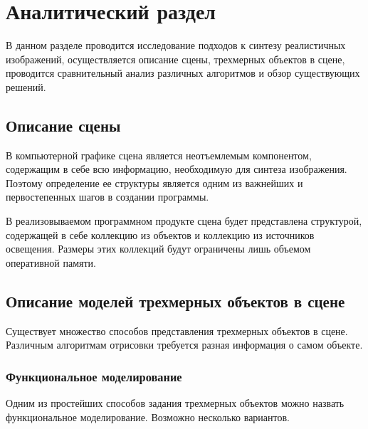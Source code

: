 \chapter{Аналитический раздел}

В данном разделе проводится исследование подходов к синтезу реалистичных изображений, осуществляется описание сцены, трехмерных объектов в сцене, проводится сравнительный анализ различных алгоритмов и обзор существующих решений.

\section{Описание сцены}

В компьютерной графике сцена является неотъемлемым компонентом, содержащим в себе всю информацию, необходимую для синтеза изображения. Поэтому определение ее структуры является одним из важнейших и первостепенных шагов в создании программы.

В реализовываемом программном продукте сцена будет представлена структурой, содержащей в себе коллекцию из объектов и коллекцию из источников освещения. Размеры этих коллекций будут ограничены лишь объемом оперативной памяти.

\section{Описание моделей трехмерных объектов в сцене}

Существует множество способов представления трехмерных объектов в сцене. Различным алгоритмам отрисовки требуется разная информация о самом объекте.

\subsection{Функциональное моделирование}

Одним из простейших способов задания трехмерных объектов можно назвать функциональное моделирование. Возможно несколько вариантов.

